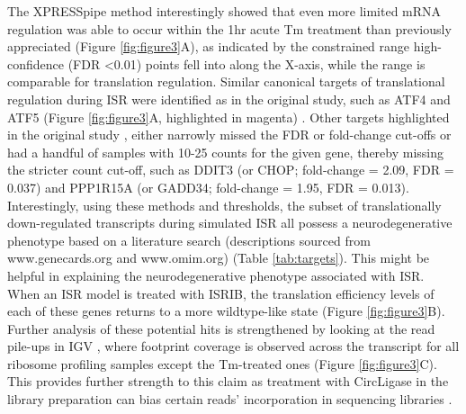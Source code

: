 \documentclass[11pt, a4paper, oneside]{article}
\begin{document}
The XPRESSpipe method interestingly showed that even more limited mRNA regulation was able to occur within the 1hr acute Tm treatment than previously appreciated (Figure \ref{fig:figure3}A), as indicated by the constrained range high-confidence (FDR \textless 0.01) points fell into along the X-axis, while the range is comparable for translation regulation. Similar canonical targets of translational regulation during ISR were identified as in the original study, such as ATF4 and ATF5 (Figure \ref{fig:figure3}A, highlighted in magenta) \cite{isrib_riboseq}. Other targets highlighted in the original study \cite{isrib_riboseq}, either narrowly missed the FDR or fold-change cut-offs or had a handful of samples with 10-25 counts for the given gene, thereby missing the stricter count cut-off, such as DDIT3 (or CHOP; fold-change = 2.09, FDR = 0.037) and PPP1R15A (or GADD34; fold-change = 1.95, FDR = 0.013). Interestingly, using these methods and thresholds, the subset of translationally down-regulated transcripts during simulated ISR all possess a neurodegenerative phenotype based on a literature search (descriptions sourced from www.genecards.org and www.omim.org) (Table \ref{tab:targets}). This might be helpful in explaining the neurodegenerative phenotype associated with ISR. When an ISR model is treated with ISRIB, the translation efficiency levels of each of these genes returns to a more wildtype-like state (Figure \ref{fig:figure3}B). Further analysis of these potential hits is strengthened by looking at the read pile-ups in IGV \cite{igv}, where footprint coverage is observed across the transcript for all ribosome profiling samples except the Tm-treated ones (Figure \ref{fig:figure3}C). This provides further strength to this claim as treatment with CircLigase in the library preparation can bias certain reads' incorporation in sequencing libraries \cite{circligase_bias}.
\end{document}
